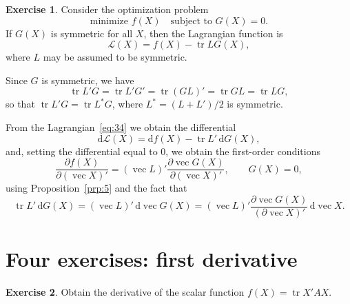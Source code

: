 \documentclass[12pt,a4paper]{article}
\makeatletter
\theoremstyle{definition}
\newtheorem{exercise}{Exercise}
\renewenvironment{proof}[1][\proofname]{\par
  \pushQED{\qed}%
  \normalfont \topsep6\p@\@plus6\p@\relax
  \trivlist
  \item[\hskip\labelsep\bfseries #1\@addpunct{.}]\ignorespaces
}{%
  \popQED\endtrivlist\@endpefalse
}
\newenvironment{solution}{%
  \begin{proof}[Solution]%
}{%
  \end{proof}%
}
\DeclareMathOperator{\tr}{tr}
\DeclareMathOperator{\avec}{vec}
\newcommand{\dd}{\mathrm{d}}
\makeatother
\begin{document}
\begin{exercise}\label{exer:18}
Consider the optimization problem
\[
\text{minimize } f(X) \quad \text{subject to } G(X) = 0.
\]
If $G(X)$ is symmetric for all $X$, then the Lagrangian function is
\[
\mathcal{L}(X) = f(X) - \tr LG(X),
\]
where $L$ may be assumed to be symmetric.
\end{exercise}

\begin{solution}
Since $G$ is symmetric, we have
\[
\tr L'G = \tr L'G' = \tr(GL)' = \tr GL = \tr LG,
\]
so that $\tr L'G = \tr L^* G$, where $L^* = (L + L')/2$ is symmetric. %
\end{solution}

From the Lagrangian~\eqref{eq:34} we obtain the differential
\begin{equation}\label{eq:35}
\dd\mathcal{L}(X) = \dd f(X) - \tr L'\, \dd G(X),
\end{equation}
and, setting the differential equal to $0$, we obtain the first-order conditions
\begin{equation}\label{eq:36}
\frac{\partial f(X)}{\partial(\avec X)'} = (\avec L)' \frac{\partial \avec G(X)}{\partial(\avec X)'}, \qquad G(X) = 0,
\end{equation}
using Proposition~\ref{prp:5} and the fact that
\[
\tr L'\, \dd G(X) = (\avec L)'\, \dd\avec G(X) = (\avec L)' \frac{\partial \avec G(X)}{(\partial \avec X)'}\, \dd\avec X.
\]

\section{Four exercises: first derivative}\label{sec:8}

\begin{exercise}\label{exer:19}
Obtain the derivative of the scalar function $f(X) = \tr X'AX$.
\end{exercise}

\end{document}

